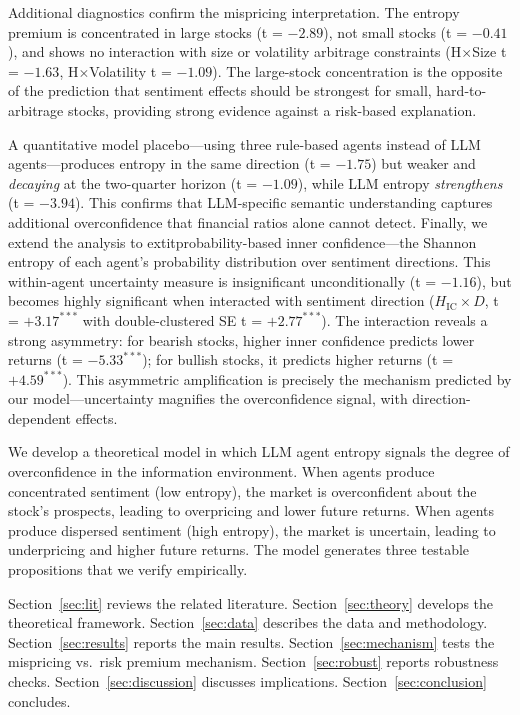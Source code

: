 \documentclass[12pt,a4paper]{article}
\begin{document}
Additional diagnostics confirm the mispricing interpretation. The entropy premium is concentrated in large stocks (t = $-2.89$), not small stocks (t = $-0.41$), and shows no interaction with size or volatility arbitrage constraints (H$\times$Size t = $-1.63$, H$\times$Volatility t = $-1.09$). The large-stock concentration is the opposite of the \citet{BakerWurgler2006} prediction that sentiment effects should be strongest for small, hard-to-arbitrage stocks, providing strong evidence against a risk-based explanation.

A quantitative model placebo---using three rule-based agents instead of LLM agents---produces entropy in the same direction (t = $-1.75$) but weaker and \textit{decaying} at the two-quarter horizon (t = $-1.09$), while LLM entropy \textit{strengthens} (t = $-3.94$). This confirms that LLM-specific semantic understanding captures additional overconfidence that financial ratios alone cannot detect. Finally, we extend the analysis to 	extit{probability-based inner confidence}---the Shannon entropy of each agent's probability distribution over sentiment directions. This within-agent uncertainty measure is insignificant unconditionally (t = $-1.16$), but becomes highly significant when interacted with sentiment direction ($H_{\text{IC}} \times D$, t = $+3.17^{***}$ with double-clustered SE t = $+2.77^{***}$). The interaction reveals a strong asymmetry: for bearish stocks, higher inner confidence predicts lower returns (t = $-5.33^{***}$); for bullish stocks, it predicts higher returns (t = $+4.59^{***}$). This asymmetric amplification is precisely the mechanism predicted by our model---uncertainty magnifies the overconfidence signal, with direction-dependent effects.

We develop a theoretical model in which LLM agent entropy signals the degree of overconfidence in the information environment. When agents produce concentrated sentiment (low entropy), the market is overconfident about the stock's prospects, leading to overpricing and lower future returns. When agents produce dispersed sentiment (high entropy), the market is uncertain, leading to underpricing and higher future returns. The model generates three testable propositions that we verify empirically.

Section~\ref{sec:lit} reviews the related literature. Section~\ref{sec:theory} develops the theoretical framework. Section~\ref{sec:data} describes the data and methodology. Section~\ref{sec:results} reports the main results. Section~\ref{sec:mechanism} tests the mispricing vs.\ risk premium mechanism. Section~\ref{sec:robust} reports robustness checks. Section~\ref{sec:discussion} discusses implications. Section~\ref{sec:conclusion} concludes.
\end{document}
